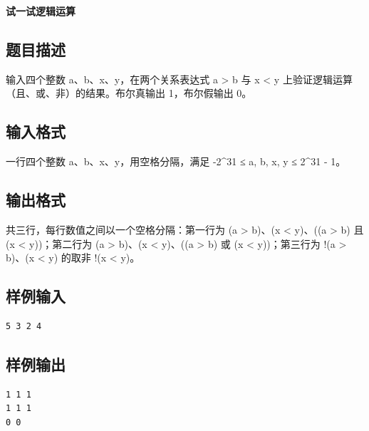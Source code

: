 \documentclass{article}
\newcommand{\problemname}[1]{\begin{center}\Large\bfseries #1\end{center}}
\begin{document}
\problemname{试一试逻辑运算}

\subsection*{题目描述}
输入四个整数 a、b、x、y，在两个关系表达式 a > b 与 x < y 上验证逻辑运算（且、或、非）的结果。布尔真输出 1，布尔假输出 0。

\subsection*{输入格式}
一行四个整数 a、b、x、y，用空格分隔，满足 -2^31 ≤ a, b, x, y ≤ 2^31 - 1。

\subsection*{输出格式}
共三行，每行数值之间以一个空格分隔：第一行为 (a > b)、(x < y)、((a > b) 且 (x < y))；第二行为 (a > b)、(x < y)、((a > b) 或 (x < y))；第三行为 !(a > b)、(x < y) 的取非 !(x < y)。

\subsection*{样例输入}
\begin{verbatim}
5 3 2 4
\end{verbatim}

\subsection*{样例输出}
\begin{verbatim}
1 1 1
1 1 1
0 0
\end{verbatim}
\end{document}
